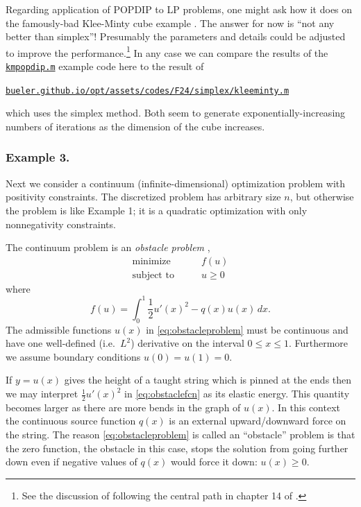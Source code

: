 \documentclass[11pt]{article}
\begin{document}
Regarding application of POPDIP to LP problems, one might ask how it does on the famously-bad Klee-Minty cube example \cite[chapter 9]{GrivaNashSofer2009}.  The answer for now is ``not any better than simplex''!   Presumably the parameters and details could be adjusted to improve the performance.\footnote{See the discussion of following the central path in chapter 14 of \cite{NocedalWright2006}.}  In any case we can compare the results of the \href{https://github.com/bueler/popdip/blob/main/matlab/kmpopdip.m}{\texttt{kmpopdip.m}} example code here to the result of

\medskip
\centerline{\href{https://bueler.github.io/opt/assets/codes/F24/simplex/kleeminty.m}{\texttt{bueler.github.io/opt/assets/codes/F24/simplex/kleeminty.m}}}

\medskip
\noindent which uses the simplex method.  Both seem to generate exponentially-increasing numbers of iterations as the dimension of the cube increases.


\subsubsection*{Example 3.}

Next we consider a continuum (infinite-dimensional) optimization problem with positivity constraints.  The discretized problem has arbitrary size $n$, but otherwise the problem is like Example 1; it is a quadratic optimization with only nonnegativity constraints.

The continuum problem is an \emph{obstacle problem} \cite[chapter 12]{Bueler2021},
\begin{equation}
\begin{matrix}
\text{minimize} \qquad & f(u) \\
\text{subject to} \qquad & u \ge 0
\end{matrix} \label{eq:obstacleproblem}
\end{equation}
where
\begin{equation}
    f(u) = \int_0^1 \frac{1}{2} u'(x)^2 - q(x) u(x)\,dx. \label{eq:obstaclefcn}
\end{equation}
The admissible functions $u(x)$ in \eqref{eq:obstacleproblem} must be continuous and have one well-defined (i.e.~$L^2$) derivative on the interval $0\le x \le 1$.  Furthermore we assume boundary conditions $u(0)=u(1)=0$.

If $y=u(x)$ gives the height of a taught string which is pinned at the ends then we may interpret $\frac{1}{2} u'(x)^2$ in \eqref{eq:obstaclefcn} as its elastic energy.  This quantity becomes larger as there are more bends in the graph of $u(x)$.  In this context the continuous source function $q(x)$ is an external upward/downward force on the string.  The reason \eqref{eq:obstacleproblem} is called an ``obstacle'' problem \cite{KinderlehrerStampacchia1980} is that the zero function, the obstacle in this case, stops the solution from going further down even if negative values of $q(x)$ would force it down: $u(x)\ge 0$.
\end{document}
